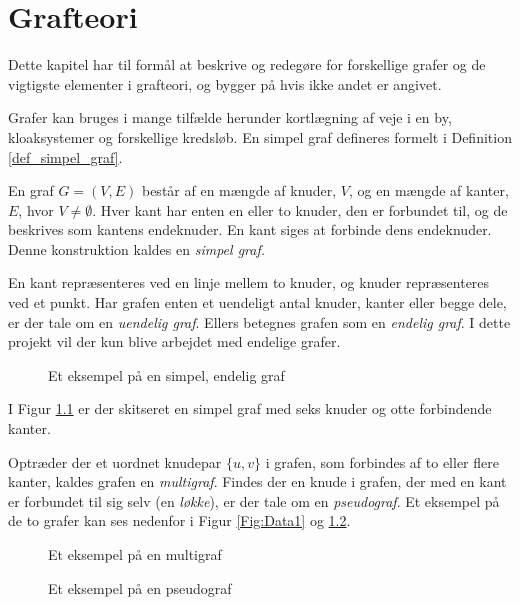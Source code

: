 \chapter{Grafteori}
\usetikzlibrary{arrows, automata}

Dette kapitel har til formål at beskrive og redegøre for forskellige grafer og de vigtigste elementer i grafteori, og bygger på \citep{dmat} hvis ikke andet er angivet. 

Grafer kan bruges i mange tilfælde herunder kortlægning af veje i en by, kloaksystemer og forskellige kredsløb.
En simpel graf defineres formelt i Definition \ref{def_simpel_graf}.


\begin{defn}
En graf $G = (V, E)$ består af en mængde af knuder, $V$, og en mængde af kanter, $E$, hvor $V \neq \emptyset$.
Hver kant har enten en eller to knuder, den er forbundet til, og de beskrives som kantens endeknuder.
En kant siges at forbinde dens endeknuder. Denne konstruktion kaldes en \it{simpel graf}.
\label{def_simpel_graf}
\end{defn}

En kant repræsenteres ved en linje mellem to knuder, og knuder repræsenteres ved et punkt.
Har grafen enten et uendeligt antal knuder, kanter eller begge dele, er der tale om en \textit{uendelig graf}.
Ellers betegnes grafen som en \textit{endelig graf}.
I dette projekt vil der kun blive arbejdet med endelige grafer.

\begin{figure}[h]
	\centering
	
	\caption{Et eksempel på en simpel, endelig graf} \label{simpel_graf}
\end{figure}

I Figur \ref{simpel_graf} er der skitseret en simpel graf med seks knuder og otte forbindende kanter. 

Optræder der et uordnet knudepar $\lbrace u,v \rbrace$ i grafen, som forbindes af to eller flere kanter, kaldes grafen en \textit{multigraf}.
Findes der en knude i grafen, der med en kant er forbundet til sig selv (en \textit{løkke}), er der tale om en \textit{pseudograf}. Et eksempel på de to grafer kan ses nedenfor i Figur \ref{Fig:Data1} og \ref{Fig:Data2}.

\begin{figure}[!htb]
   \begin{minipage}{0.48\textwidth}
     \centering
     
     \caption{Et eksempel på en multigraf}\label{Fig:Data1}
   \end{minipage}\hfill
   \begin{minipage}{0.48\textwidth}
     \centering
     
     \caption{Et eksempel på en pseudograf}\label{Fig:Data2}
   \end{minipage}
\end{figure}

